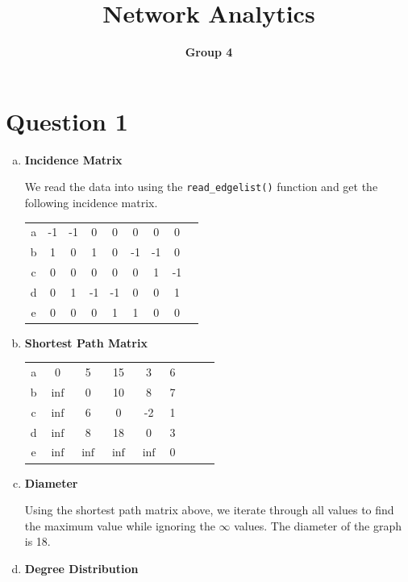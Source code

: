 \documentclass[a4paper]{article}
\begin{document}
\title{Network Analytics}
\author{\bf Group 4}
\maketitle
\section*{Question 1}

\begin{enumerate}[(a)]
\item \textbf{Incidence Matrix}

We read the data into using the \texttt{read\_edgelist()} function and get the following incidence matrix.
\begin{table}[ht]
\begin{center}
\begin{tabular}{c|cccccccc}
a & -1 & -1 	& 0 	& 0 	& 0	& 0	&0\\
b &1 	& 0	& 1 	& 0	& -1	& -1	& 0\\
c &0 	& 0 	& 0 	& 0	&0	&1	&-1\\
d & 0 	& 1 	& -1 	& -1	& 0	&0	&1\\
e & 0 	& 0 	& 0 	& 1	& 1	&0	&0
\end{tabular}
\end{center}
\end{table}

\item \textbf{Shortest Path Matrix}

\begin{table}[ht]
\begin{center}
\begin{tabular}{c|cccccccc}
a & 0 		& 5	& 15	& 3 	& 6\\
b &$\inf$ 	& 0	& 10 	& 8	& 7\\
c &$\inf$ 	& 6 	& 0 	& -2	& 1\\
d &$\inf$ 	& 8 	& 18 	& 0	& 3\\
e &$\inf$ 	&$\inf$& $\inf$& $\inf$	& 0
\end{tabular}
\end{center}
\end{table}

\item \textbf{Diameter}

Using the shortest path matrix above, we iterate through all values to find the maximum value while ignoring the $\infty$ values. The diameter of the graph is 18.

\item \textbf{Degree Distribution}


\end{enumerate}
\end{document}
